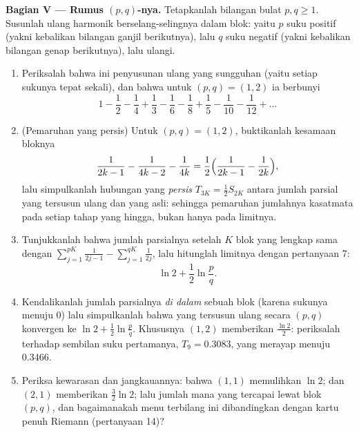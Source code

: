 \begin{problem}[{Soal akhir pekan --- $H_n = \ln n + \gamma +
\frac{1}{2n} + O(n^{-2})$, dan menyusun ulang $1 - \frac12 +
\frac13 - \dots$ menjadi $\frac{\ln 2}{2}$}]
\medskip
\noindent\textbf{Bagian V --- Rumus $(p, q)$-nya.} Tetapkanlah bilangan bulat
$p, q \geq 1$. Susunlah ulang  harmonik berselang-selingnya dalam
blok: yaitu $p$ suku positif (yakni kebalikan bilangan ganjil berikutnya), lalu $q$
suku negatif (yakni kebalikan bilangan genap berikutnya), lalu ulangi.
\begin{enumerate}[resume]
  \item Periksalah bahwa ini penyusunan ulang yang sungguhan (yaitu setiap sukunya
        tepat sekali), dan bahwa untuk $(p, q) = (1, 2)$ ia berbunyi
        \[
        1 - \frac12 - \frac14 + \frac13 - \frac16 - \frac18 +
        \frac15 - \frac1{10} - \frac1{12} + \dots
        \]
  \item (Pemaruhan yang persis) Untuk $(p, q) = (1, 2)$, buktikanlah
        kesamaan bloknya
        \[
        \frac{1}{2k-1} - \frac{1}{4k-2} - \frac{1}{4k}
        = \frac12\Bigl(\frac{1}{2k-1} - \frac{1}{2k}\Bigr),
        \]
        lalu simpulkanlah hubungan yang \emph{persis} $T_{3K} = \frac12
        S_{2K}$ antara jumlah parsial yang tersusun ulang dan yang
        asli: sehingga pemaruhan jumlahnya kasatmata pada
        setiap tahap yang hingga, bukan hanya pada limitnya.
  \item Tunjukkanlah bahwa jumlah parsialnya setelah $K$ blok yang lengkap
        sama dengan $\sum_{j=1}^{pK} \frac{1}{2j-1} -
        \sum_{j=1}^{qK} \frac{1}{2j}$, lalu hitunglah limitnya
        dengan pertanyaan 7:
        \[
        \ln 2 + \frac12 \ln\frac pq .
        \]
  \item Kendalikanlah jumlah parsialnya \emph{di dalam} sebuah blok (karena
        sukunya menuju $0$) lalu simpulkanlah bahwa  yang tersusun ulang
        secara $(p, q)$ konvergen ke $\ln 2 + \frac12\ln
        \frac pq$. Khususnya $(1, 2)$ memberikan $\frac{\ln
        2}{2}$: periksalah terhadap sembilan suku pertamanya, $T_9 =
        0.3083$, yang merayap menuju $0.3466$.
  \item Periksa kewarasan dan jangkauannya: bahwa $(1,1)$ memulihkan $\ln 2$;
        dan $(2,1)$ memberikan $\frac32\ln 2$; lalu jumlah mana yang tercapai
        lewat blok $(p, q)$, dan bagaimanakah menu terbilang ini
        dibandingkan dengan kartu penuh Riemann (pertanyaan 14)?
\end{enumerate}


\end{problem}
